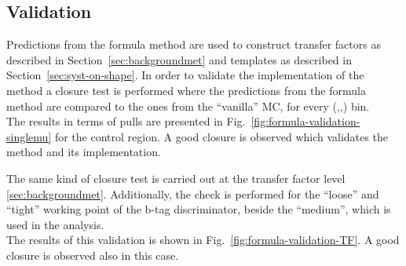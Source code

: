 \subsection{Validation}
\label{sec:formula-validation}

Predictions from the formula method are used to construct transfer 
factors as described in Section~\ref{sec:backgroundmet} and \mht templates 
as described in Section~\ref{sec:syst-on-shape}. 
In order to validate the implementation of the method 
a closure test is performed where the predictions from the formula method 
are compared to the ones from the ``vanilla'' MC, for every 
(\njet,\scalht,\mht) bin. \\
The results in terms of pulls are presented in Fig.~\ref{fig:formula-validation-singlemu} for the \mj control region. 
A good closure is observed which validates the method and its implementation.

The same kind of closure test is carried out at the transfer factor level \ref{sec:backgroundmet}. %
Additionally, the check is performed for the ``loose'' and ``tight'' working point of the b-tag discriminator, 
beside the ``medium'', which is used in the analysis. \\
The results of this validation is shown in Fig.~\ref{fig:formula-validation-TF}. 
A good closure is observed also in this case. 

